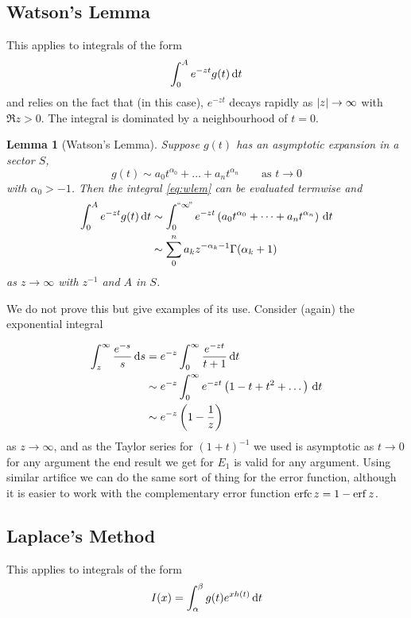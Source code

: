 \documentclass{notes}
\theoremstyle{plain}
\newtheorem*{lemma}{Lemma}
\begin{document}
\subsection{Watson's Lemma}

This applies to integrals of the form
\begin{equation}\label{eq:wlem}
\int_0^A e^{- z t} g(t)\, \mathrm{d} t
\end{equation}
and relies on the fact that (in this case), $e^{-z t}$ decays rapidly as
$\left|z\right| \to \infty$ with $\Re z > 0$.  The integral is dominated by a
neighbourhood of $t=0$.

\begin{lemma}[Watson's Lemma]
Suppose $g(t)$ has an asymptotic expansion in a sector $S$,
\[
g(t) \sim a_0 t^{\alpha_0} + \dots + a_n t^{\alpha_n} \qquad \text{as }
t \to 0
\]
with $\alpha_0 > - 1$.  Then the integral \eqref{eq:wlem} can be evaluated
termwise and
\begin{align*}
\int_0^A e^{- z t} g(t)\, \mathrm{d} t &\sim
\int_0^{\text{``$\infty\!$''}} e^{-z t} \left( a_0 t^{\alpha_0} + \dots +
a_n t^{\alpha_n}\right)\, \mathrm{d} t \\
&\sim \sum_0^n a_k z^{-\alpha_k - 1} \Gamma(\alpha_k+1)
\end{align*}
as $z \to \infty$ with $z^{-1}$ and $A$ in $S$. 
\end{lemma}

We do not prove this but give examples of its use.  Consider (again) the
exponential integral

\begin{align*}
\int_z^\infty \frac{e^{-s}}{s}\, \mathrm{d} s
&= e^{-z} \int_0^\infty \frac{e^{-zt}}{t+1}\, \mathrm{d} t \\
&\sim e^{-z} \int_0^\infty e^{-zt} \left(1 - t +t^2 + \dots\right)\, \mathrm{d} t \\
&\sim e^{-z} \left( 1 - \frac{1}{z} \right)
\end{align*}
as $z \to \infty$, and as the Taylor series for $(1+t)^{-1}$ we used is
asymptotic as $t \to 0$ for any argument the end result we get for
$E_1$ is valid for any argument.  Using similar artifice we can do
the same sort of thing for the error function, although it is easier to
work with the complementary error function $\operatorname{erfc} z = 1 - \operatorname{erf} z$.

\subsection{Laplace's Method}

This applies to integrals of the form
\begin{equation}\label{eq:lapmet}
I(x) = \int_\alpha^\beta g(t) e^{x h(t)}\, \mathrm{d} t
\end{equation}
\end{document}
